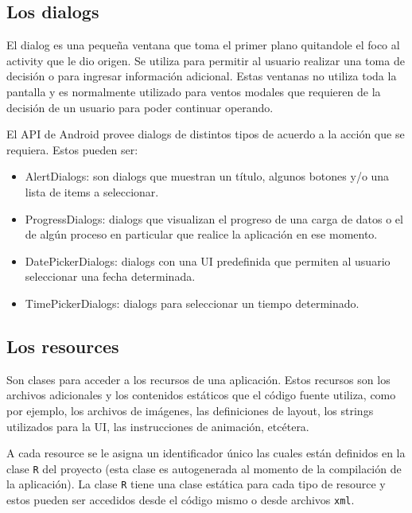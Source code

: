 \subsection{Los dialogs}
\label{subsec:dev.dialogs}

El dialog es una peque\~na ventana que toma el primer plano quitandole el foco al activity que le dio origen. Se utiliza para permitir al usuario realizar una toma de decisi\'on o para ingresar informaci\'on adicional. Estas ventanas no utiliza toda la pantalla y es normalmente utilizado para ventos modales que requieren de la decisi\'on de un usuario para poder continuar operando.

El \ac{API} de Android provee dialogs de distintos tipos de acuerdo a la acci\'on que se requiera. Estos pueden ser:

\begin{itemize}
\item AlertDialogs: son dialogs que muestran un t\'itulo, algunos botones y/o una lista de items a seleccionar.
\item ProgressDialogs: dialogs que visualizan el progreso de una carga de datos o el de alg\'un proceso en particular que realice la aplicaci\'on en ese momento.
\item DatePickerDialogs: dialogs con una \ac{UI} predefinida que permiten al usuario seleccionar una fecha determinada.
\item TimePickerDialogs: dialogs para seleccionar un tiempo determinado.
\end{itemize}
 
\subsection{Los resources}
\label{subsec:dev.resources}

Son clases para acceder a los recursos de una aplicaci\'on. Estos recursos son los archivos adicionales y los contenidos est\'aticos que el c\'odigo fuente utiliza, como por ejemplo, los archivos de im\'agenes, las definiciones de layout, los strings utilizados para la \ac{UI}, las instrucciones de animaci\'on, etc\'etera.

A cada resource se le asigna un identificador \'unico las cuales est\'an definidos en la clase \texttt{R} del proyecto (esta clase es autogenerada al momento de la compilaci\'on de la aplicaci\'on). La clase \texttt{R} tiene una clase est\'atica para cada tipo de resource y estos pueden ser accedidos desde el c\'odigo mismo o desde archivos \texttt{xml}.

